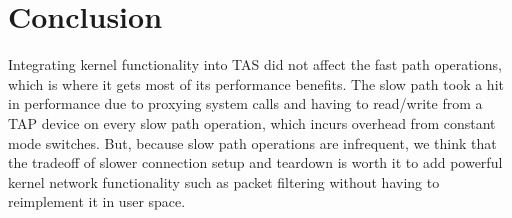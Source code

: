 \section{Conclusion}\label{Conclusion}


Integrating kernel functionality into TAS did not affect the fast path operations, which is where
it gets most of its performance benefits.
The slow path took a hit in performance due to proxying system calls and having to 
read/write from a TAP device on every slow path
operation, which incurs overhead from constant mode switches.
But, because slow path operations are infrequent, we think that the tradeoff of slower connection setup
and teardown is worth it to add powerful kernel network functionality such as packet filtering without
having to reimplement it in user space.


